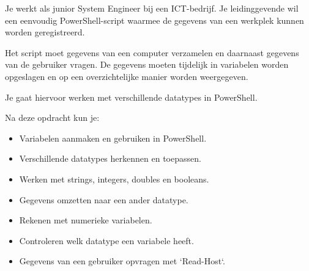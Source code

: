 Je werkt als junior System Engineer bij een ICT-bedrijf. Je leidinggevende wil een eenvoudig PowerShell-script waarmee de gegevens van een werkplek kunnen worden geregistreerd.

Het script moet gegevens van een computer verzamelen en daarnaast gegevens van de gebruiker vragen. De gegevens moeten tijdelijk in variabelen worden opgeslagen en op een overzichtelijke manier worden weergegeven.

Je gaat hiervoor werken met verschillende datatypes in PowerShell.

Na deze opdracht kun je:

\begin{itemize}
\item Variabelen aanmaken en gebruiken in PowerShell.
\item Verschillende datatypes herkennen en toepassen.
\item Werken met strings, integers, doubles en booleans.
\item Gegevens omzetten naar een ander datatype.
\item Rekenen met numerieke variabelen.
\item Controleren welk datatype een variabele heeft.
\item Gegevens van een gebruiker opvragen met `Read-Host`.
\end{itemize}

